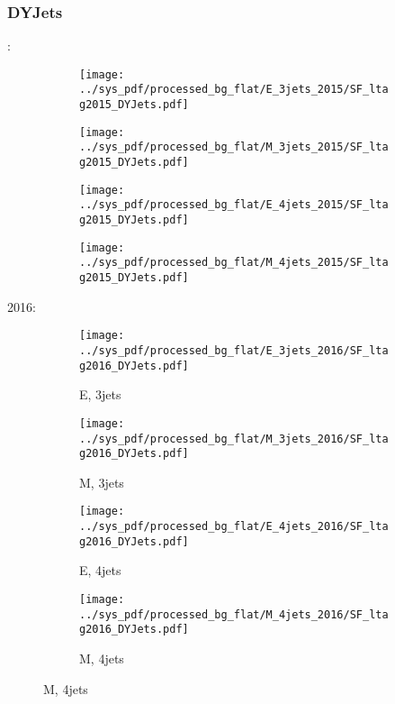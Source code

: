 \documentclass{beamer}
\begin{document}
\begin{frame}
\frametitle{DYJets}
\fontsize{5}{1}:
\begin{figure}
\centering
\begin{subfigure}[b]{0.24\textwidth}
\texttt{[image: ../sys\_pdf/processed\_bg\_flat/E\_3jets\_2015/SF\_ltag2015\_DYJets.pdf]}
\end{subfigure}
\begin{subfigure}[b]{0.24\textwidth}
\texttt{[image: ../sys\_pdf/processed\_bg\_flat/M\_3jets\_2015/SF\_ltag2015\_DYJets.pdf]}
\end{subfigure}
\begin{subfigure}[b]{0.24\textwidth}
\texttt{[image: ../sys\_pdf/processed\_bg\_flat/E\_4jets\_2015/SF\_ltag2015\_DYJets.pdf]}
\end{subfigure}
\begin{subfigure}[b]{0.24\textwidth}
\texttt{[image: ../sys\_pdf/processed\_bg\_flat/M\_4jets\_2015/SF\_ltag2015\_DYJets.pdf]}
\end{subfigure}
\end{figure}
2016:
\begin{figure}
\centering
\begin{subfigure}[b]{0.24\textwidth}
\texttt{[image: ../sys\_pdf/processed\_bg\_flat/E\_3jets\_2016/SF\_ltag2016\_DYJets.pdf]}
\captionsetup{font=tiny}
\caption{E, 3jets}
\end{subfigure}
\begin{subfigure}[b]{0.24\textwidth}
\texttt{[image: ../sys\_pdf/processed\_bg\_flat/M\_3jets\_2016/SF\_ltag2016\_DYJets.pdf]}
\captionsetup{font=tiny}
\caption{M, 3jets}
\end{subfigure}
\begin{subfigure}[b]{0.24\textwidth}
\texttt{[image: ../sys\_pdf/processed\_bg\_flat/E\_4jets\_2016/SF\_ltag2016\_DYJets.pdf]}
\captionsetup{font=tiny}
\caption{E, 4jets}
\end{subfigure}
\begin{subfigure}[b]{0.24\textwidth}
\texttt{[image: ../sys\_pdf/processed\_bg\_flat/M\_4jets\_2016/SF\_ltag2016\_DYJets.pdf]}
\captionsetup{font=tiny}
\caption{M, 4jets}
\end{subfigure}
\end{figure}
\end{frame}
\end{document}
